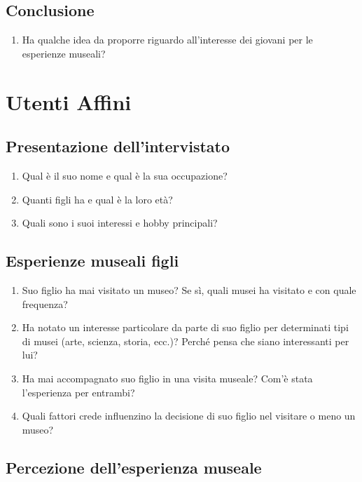\documentclass[a4paper, 12pt]{article}
\begin{document}
\subsection{\textcolor{subsectioncolor}{Conclusione}}

\begin{enumerate}
    \item Ha qualche idea da proporre riguardo all'interesse dei giovani per le esperienze museali?
\end{enumerate}

\newpage

\section{\textcolor{sectioncolor}{Utenti Affini}}
\subsection{\textcolor{subsectioncolor}{Presentazione dell'intervistato}}

\begin{enumerate}
    \item Qual è il suo nome e qual è la sua occupazione?
    \item Quanti figli ha e qual è la loro età?
    \item Quali sono i suoi interessi e hobby principali?
\end{enumerate}

\subsection{\textcolor{subsectioncolor}{Esperienze museali figli}}

\begin{enumerate}
    \item Suo figlio ha mai visitato un museo? Se sì, quali musei ha visitato e con quale frequenza?
    \item Ha notato un interesse particolare da parte di suo figlio per determinati tipi di musei (arte, scienza, storia, ecc.)? Perché pensa che siano interessanti per lui?
    \item Ha mai accompagnato suo figlio in una visita museale? Com'è stata l'esperienza per entrambi?
    \item Quali fattori crede influenzino la decisione di suo figlio nel visitare o meno un museo?
\end{enumerate}

\subsection{\textcolor{subsectioncolor}{Percezione dell’esperienza museale}}
\end{document}
